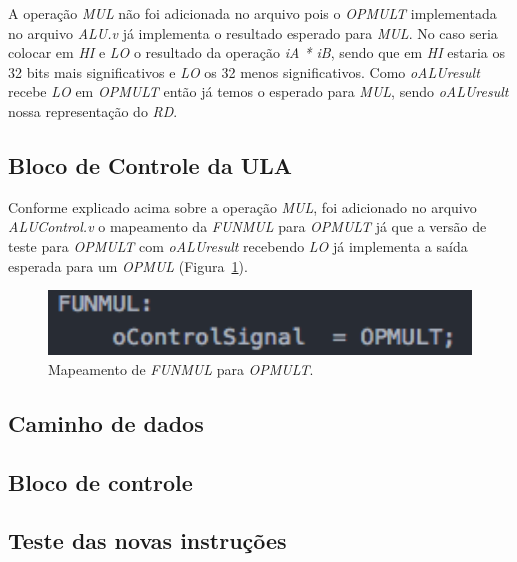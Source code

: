 \documentclass[12pt]{article}
\begin{document}
A operação \textit{MUL} não foi adicionada no arquivo pois o \textit{OPMULT} implementada no arquivo \textit{ALU.v} já implementa o resultado esperado para \textit{MUL}. No caso seria colocar em \textit{HI} e \textit{LO} o resultado da operação \textit{iA * iB}, sendo que em \textit{HI} estaria os 32 bits mais significativos e \textit{LO} os 32 menos significativos. Como \textit{oALUresult} recebe \textit{LO} em \textit{OPMULT} então já temos o esperado para \textit{MUL}, sendo \textit{oALUresult} nossa representação do \textit{RD}.

\subsection{Bloco de Controle da ULA}
\label{subsec:alucontrol}

Conforme explicado acima sobre a operação \textit{MUL}, foi adicionado no arquivo \textit{ALUControl.v} o mapeamento da \textit{FUNMUL} para \textit{OPMULT} já que a versão de teste para \textit{OPMULT} com \textit{oALUresult} recebendo \textit{LO} já implementa a saída esperada para um \textit{OPMUL} (Figura~\ref{fig:controlfunc}). 

\begin{figure}[H]
	\flushleft
	\includegraphics[width=1\textwidth]{controlfunc.png}
	\caption{Mapeamento de \textit{FUNMUL} para \textit{OPMULT}.}
	\label{fig:controlfunc}
\end{figure}


\subsection{Caminho de dados}
\label{subsec:datapath}

\subsection{Bloco de controle}
\label{subsec:control}

\subsection{Teste das novas instruções}
\label{subsec:testeisa}



\end{document}
